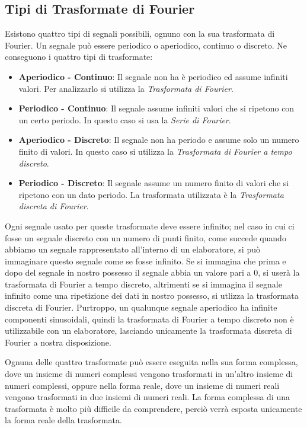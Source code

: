 \subsection{Tipi di Trasformate di Fourier}
Esistono quattro tipi di segnali possibili, ognuno con la sua trasformata di
Fourier. Un segnale pu\`o essere periodico o aperiodico, continuo o discreto. Ne
conseguono i quattro tipi di trasformate:
\begin{itemize}
	\item \textbf{Aperiodico - Continuo}: Il segnale non ha \`e periodico ed
		assume infiniti valori. Per analizzarlo si utilizza la \emph{Trasformata
		di Fourier}.
	\item \textbf{Periodico - Continuo}: Il segnale assume infiniti valori che
		si ripetono con un certo periodo. In questo caso si usa la \emph{Serie
		di Fourier}.
	\item \textbf{Aperiodico - Discreto}: Il segnale non ha periodo e assume
		solo un numero finito di valori. In questo caso si utilizza la
		\emph{Trasformata di Fourier a tempo discreto}.
	\item \textbf{Periodico - Discreto}: Il segnale assume un numero finito di
		valori che si ripetono con un dato periodo. La trasformata utilizzata
		\`e la \emph{Trasformata discreta di Fourier}.
\end{itemize}
Ogni segnale usato per queste trasformate deve essere infinito; nel caso in cui
ci fosse un segnale discreto con un numero di punti finito, come succede quando
abbiamo un segnale rappresentato all'interno di un elaboratore, si pu\`o
immaginare questo segnale come se fosse infinito. Se si immagina che prima e
dopo del segnale in nostro possesso il segnale abbia un valore pari a 0, si
user\`a la trasformata di Fourier a tempo discreto, altrimenti se si immagina il
segnale infinito come una ripetizione dei dati in nostro possesso, si utlizza la
trasformata discreta di Fourier. Purtroppo, un qualunque segnale aperiodico ha
infinite componenti sinusoidali, quindi la trasformata di Fourier a tempo
discreto non \`e utilizzabile con un elaboratore, lasciando unicamente la
trasformata discreta di Fourier a nostra disposizione.

Ognuna delle quattro trasformate pu\`o essere eseguita nella sua forma
complessa, dove un insieme di numeri complessi vengono trasformati in un'altro
insieme di numeri complessi, oppure nella forma reale, dove un insieme di numeri
reali vengono trasformati in due insiemi di numeri reali. La forma complessa
di una trasformata \`e molto pi\`u difficile da comprendere, perci\`o verr\`a
esposta unicamente la forma reale della trasformata.

